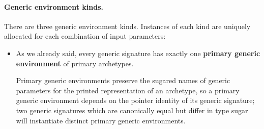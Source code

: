 \documentclass[../generics]{subfiles}
\begin{document}
\paragraph{Generic environment kinds.}
There are three generic environment kinds. Instances of each kind are uniquely allocated for each combination of input parameters:
\begin{itemize}
\item As we already said, every generic signature has exactly one \textbf{primary generic environment} of primary archetypes.
\begin{tightcenter}
\end{tightcenter}
Primary generic environments preserve the sugared names of generic parameters for the printed representation of an archetype, so a primary generic environment depends on the pointer identity of its generic signature; two generic signatures which are canonically equal but differ in type sugar will instantiate distinct primary generic environments.


\end{itemize}
\end{document}
